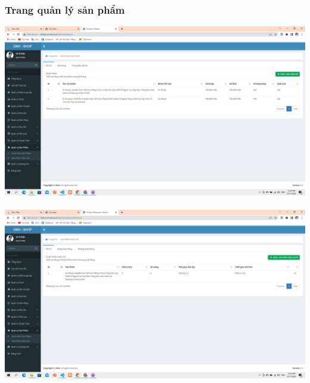 \documentclass[12pt,a4paper,2sides]{report}
\begin{document}
\subsubsection{Trang quản lý sản phẩm}
    \includegraphics[width=1\linewidth]{lib/results/danhsachsp.jpg}\\\vspace*{1cm} 
    \hspace{5cm}{Hình 51. Danh sách sản phẩm}\\
    \includegraphics[width=1\linewidth]{lib/results/sanphamgiamgia.jpg}\\\vspace*{1cm}
    \hspace{5cm}{Hình 52. Quản lý sản phẩm giảm giá}\\
\end{document}
